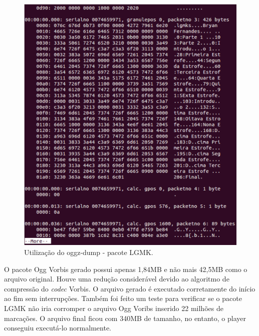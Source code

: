 \begin{figure}[ht]
	\centering
		\includegraphics[keepaspectratio=true,scale=0.4]{figuras/hnblgmkogg.eps}
	\caption{Utilização do oggz-dump - pacote LGMK.}
	\label{lgmk}
\end{figure}

O pacote Ogg Vorbis gerado possui apenas 1,84MB e não mais 42,5MB como o arquivo original. Houve uma redução considerável devido ao algoritmo de compressão do \textit{codec} Vorbis. O arquivo gerado é executado corretamente do início ao fim sem interrupções. Também foi feito um teste para verificar se o pacote LGMK não iria corromper o arquivo Ogg Voribs inserido 22 milhões de marcações. O arquivo final ficou com 340MB de tamanho, no entanto, o player conseguiu executá-lo normalmente.


%

